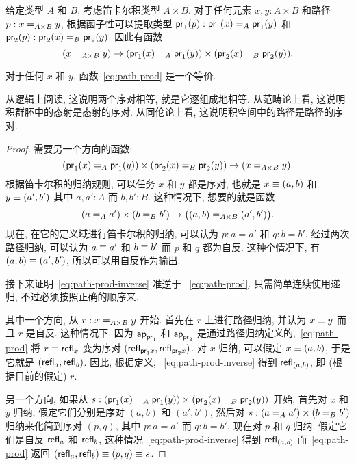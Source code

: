 %
给定类型 $A$ 和 $B$, 考虑笛卡尔积类型 $A \times B$.
对于任何元素 $x,y:A\times B$ 和路径 $p:\id[A\times B]{x}{y}$, 根据函子性可以提取类型 $\ap{\proj1}p:\id[A]{\proj1(x)}{\proj1(y)}$ 和 $\ap{\proj2}p:\id[B]{\proj2(x)}{\proj2(y)}$.
因此有函数
\begin{equation}
    \label{eq:path-prod}
    (\id[A\times B]{x}{y}) \to (\id[A]{\proj1(x)}{\proj1(y)}) \times (\id[B]{\proj2(x)}{\proj2(y)}).
\end{equation}

\begin{thm}
    \label{thm:path-prod}
    对于任何 $x$ 和 $y$, 函数~\eqref{eq:path-prod} 是一个等价.
\end{thm}

从逻辑上阅读, 这说明两个序对相等, 就是它逐组成地相等.
从范畴论上看, 这说明积群胚中的态射是态射的序对.
从同伦论上看, 这说明积空间中的路径是路径的序对.

\begin{proof}
    需要另一个方向的函数:
    \begin{equation}
    (\id[A]{\proj1(x)}{\proj1(y)})
        \times (\id[B]{\proj2(x)}{\proj2(y)}) \to (\id[A\times B]{x}{y}). \label{eq:path-prod-inverse}
    \end{equation}
    根据笛卡尔积的归纳规则, 可以任务 $x$ 和 $y$ 都是序对, 也就是 $x\jdeq (a,b)$ 和 $y\jdeq (a',b')$ 其中 $a,a':A$ 而 $b,b':B$.
    这种情况下, 想要的就是函数
    \begin{equation*}
    (\id[A]{a}{a'})
        \times (\id[B]{b}{b'}) \to \big(\id[A\times B]{(a,b)}{(a',b')}\big).
    \end{equation*}
    现在, 在它的定义域进行笛卡尔积的归纳, 可以认为 $p:a=a'$ 和 $q:b=b'$.
    经过两次路径归纳, 可以认为 $a\jdeq a'$ 和 $b\jdeq b'$ 而 $p$ 和 $q$ 都为自反.
    这种个情况下, 有 $(a,b)\jdeq(a',b')$, 所以可以用自反作为输出.

    接下来证明~\eqref{eq:path-prod-inverse} 准逆于 ~\eqref{eq:path-prod}.
    只需简单连续使用递归, 不过必须按照正确的顺序来.

    其中一个方向, 从 $r:\id[A\times B]{x}{y}$ 开始.
    首先在 $r$ 上进行路径归纳, 并认为 $x\jdeq y$ 而且 $r$ 是自反.
    这种情况下, 因为 $\apfunc{\proj1}$ 和 $\apfunc{\proj2}$ 是通过路径归纳定义的,~\eqref{eq:path-prod} 将 $r\jdeq \refl{x}$ 变为序对 $(\refl{\proj1x},\refl{\proj2x})$.
    对 $x$ 归纳, 可以假定 $x\jdeq (a,b)$, 于是它就是 $(\refl a, \refl b)$.
    因此, 根据定义, ~\eqref{eq:path-prod-inverse} 得到 $\refl{(a,b)}$, 即 (根据目前的假定) $r$.

    另一个方向, 如果从 $s:(\id[A]{\proj1(x)}{\proj1(y)}) \times (\id[B]{\proj2(x)}{\proj2(y)})$ 开始, 首先对 $x$ 和 $y$ 归纳, 假定它们分别是序对 $(a,b)$ 和 $(a',b')$, 然后对 $s:(\id[A]{a}{a'}) \times (\id[B]{b}{b'})$ 归纳来化简到序对 $(p,q)$, 其中 $p:a=a'$ 而 $q:b=b'$.
    现在对 $p$ 和 $q$ 归纳, 假定它们是自反 $\refl a$ 和 $\refl b$, 这种情况~\eqref{eq:path-prod-inverse} 得到 $\refl{(a,b)}$ 而~\eqref{eq:path-prod} 返回 $(\refl a,\refl b)\jdeq (p,q)\jdeq s$.
\end{proof}

